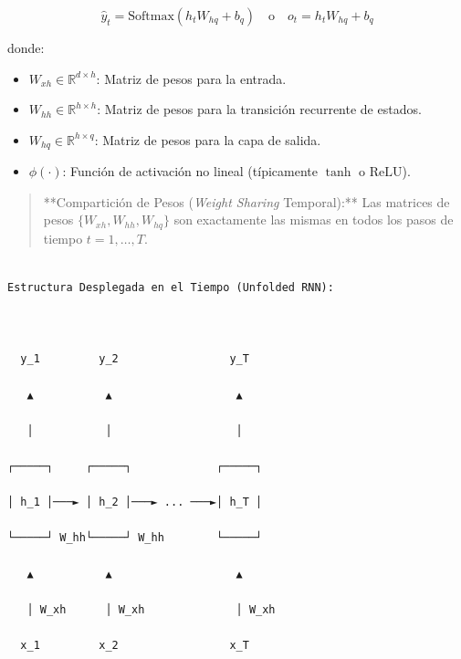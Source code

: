 \documentclass[11pt,oneside]{article}
\begin{document}
\[\hat{y}_t = \text{Softmax}\left(h_t W_{hq} + b_q\right) \quad \text{o} \quad o_t = h_t W_{hq} + b_q\]

donde:

\begin{itemize}

\item \(W_{xh} \in \mathbb{R}^{d \times h}\): Matriz de pesos para la entrada.

\end{itemize}

\begin{itemize}

\item \(W_{hh} \in \mathbb{R}^{h \times h}\): Matriz de pesos para la transición recurrente de estados.

\end{itemize}

\begin{itemize}

\item \(W_{hq} \in \mathbb{R}^{h \times q}\): Matriz de pesos para la capa de salida.

\end{itemize}

\begin{itemize}

\item \(\phi(\cdot)\): Función de activación no lineal (típicamente \(\tanh\) o \(\text{ReLU}\)).

\end{itemize}

\begin{quote}**Compartición de Pesos (\emph{Weight Sharing} Temporal):** Las matrices de pesos \(\{W_{xh}, W_{hh}, W_{hq}\}\) son exactamente las mismas en todos los pasos de tiempo \(t=1, \dots, T\).\end{quote}

\begin{quote}\end{quote}

\begin{quote}\end{quote}

\begin{lstlisting}

Estructura Desplegada en el Tiempo (Unfolded RNN):



  y_1         y_2                 y_T

   ▲           ▲                   ▲

   │           │                   │

┌─────┐     ┌─────┐             ┌─────┐

│ h_1 │───► │ h_2 │───► ... ───►│ h_T │

└─────┘ W_hh└─────┘ W_hh        └─────┘

   ▲           ▲                   ▲

   │ W_xh      │ W_xh              │ W_xh

  x_1         x_2                 x_T



\end{lstlisting}
\end{document}
